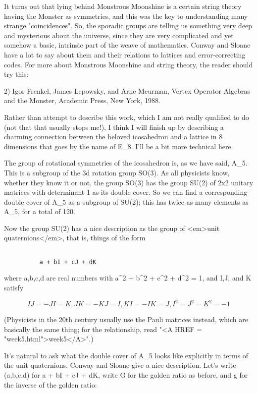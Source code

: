 It turns out that lying behind Monstrous Moonshine is a certain
string theory having the Monster as symmetries, and this was
the key to understanding many strange "coincidences". 
So, the sporadic groups are telling us something very deep and
mysterious about the universe, since they are very complicated and yet
somehow a basic, intrinsic part of the weave of mathematics.  Conway
and Sloane have a lot to say about them and their relations to lattices
and error-correcting codes.   For more about Monstrous Moonshine
and string theory, the reader should try this:

2) Igor Frenkel, James Lepowsky, and Arne Meurman, Vertex Operator
Algebras and the Monster, Academic Press, New York, 1988.

Rather than attempt to describe this work, which I am not really
qualified to do (not that that usually stops me!), I think I will finish
up by describing a charming connection between the beloved icosahedron
and a lattice in 8 dimensions that goes by the name of E_{8}.
I'll be a bit more technical here.


The group of rotational symmetries of the icosahedron is, as we have
said, A_{5}.  This is a subgroup of the 3d rotation group SO(3).
As all physicists know, whether they know it or not, the group SO(3) has
the group SU(2) of 2x2 unitary matrices with determinant 1 as its double
cover.  So we can find a corresponding double cover of A_{5} 
as a subgroup
of SU(2); this has twice as many elements as A_{5}, for a total of 120.

Now the group SU(2) has a nice description as the group of <em>unit
quaternions</em>, that is, things of the form
 

\begin{verbatim}

          a + bI + cJ + dK
\end{verbatim}
    
where a,b,c,d are real numbers with a^{2} + b^{2} + c^{2} + d^{2} = 1, and
I,J, and K satisfy 

$$

IJ = -JI = K,	JK = -KJ = I,    KI = -IK = J,   I^{2} = J^{2} = K^{2} = -1
$$
    
(Physicists in the 20th century usually use the Pauli matrices instead,
which are basically the same thing; for the relationship, read "<A HREF = "week5.html">week5</A>".)


It's natural to ask what the double cover of A_{5} looks like
explicitly in terms of the unit quaternions.  Conway and Sloane give a
nice description.  Let's write (a,b,c,d) for a + bI + cJ + dK, write G
for the golden ratio as before, and g for the inverse of the golden
ratio:


